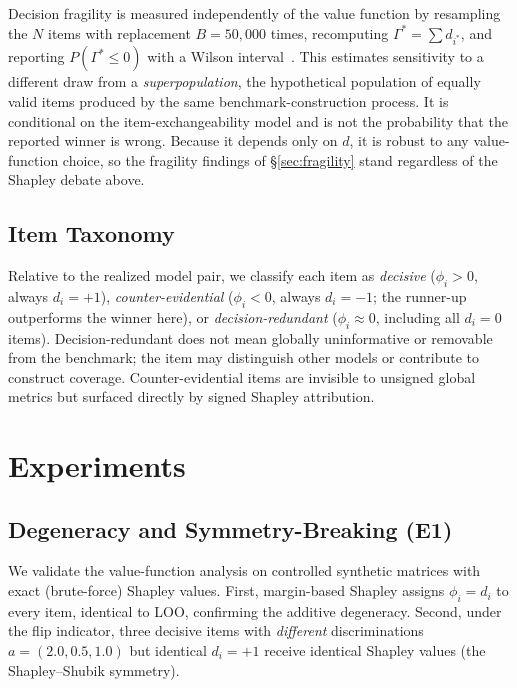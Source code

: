 \documentclass[conference]{IEEEtran}
\begin{document}
Decision fragility is measured independently of the value function by resampling the $N$ items with replacement $B=50{,}000$ times, recomputing $\Gamma^*=\sum d_{i^*}$, and reporting $P(\Gamma^*\leq 0)$ with a Wilson interval~\cite{efron1979bootstrap}.
This estimates sensitivity to a different draw from a \emph{superpopulation}, the hypothetical population of equally valid items produced by the same benchmark-construction process.
It is conditional on the item-exchangeability model and is not the probability that the reported winner is wrong.
Because it depends only on $d$, it is robust to any value-function choice, so the fragility findings of \S\ref{sec:fragility} stand regardless of the Shapley debate above.

\subsection{Item Taxonomy}
\label{sec:taxonomy}

Relative to the realized model pair, we classify each item as \emph{decisive} ($\phi_i>0$, always $d_i=+1$), \emph{counter-evidential} ($\phi_i<0$, always $d_i=-1$; the runner-up outperforms the winner here), or \emph{decision-redundant} ($\phi_i\approx 0$, including all $d_i=0$ items).
Decision-redundant does not mean globally uninformative or removable from the benchmark; the item may distinguish other models or contribute to construct coverage.
Counter-evidential items are invisible to unsigned global metrics but surfaced directly by signed Shapley attribution.

\section{Experiments}
\label{sec:experiments}

\subsection{Degeneracy and Symmetry-Breaking (E1)}
\label{sec:e1}

We validate the value-function analysis on controlled synthetic matrices with exact (brute-force) Shapley values.
First, margin-based Shapley assigns $\phi_i=d_i$ to every item, identical to LOO, confirming the additive degeneracy.
Second, under the flip indicator, three decisive items with \emph{different} discriminations $a=(2.0,0.5,1.0)$ but identical $d_i=+1$ receive identical Shapley values (the Shapley--Shubik symmetry).
\end{document}
